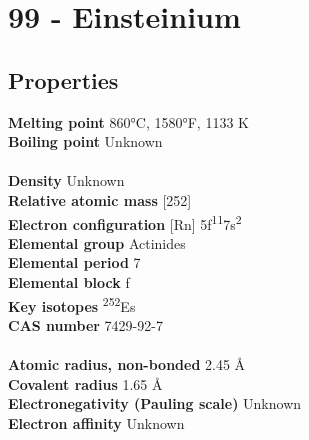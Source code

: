 \section{99 - Einsteinium}
\label{sec:elem-einsteinium}
\subsection{Properties}
\textbf{Melting point} 860°C, 1580°F, 1133 K\\
\textbf{Boiling point} Unknown\\
\\
\textbf{Density} Unknown\\
\textbf{Relative atomic mass} [252]\\
\textbf{Electron configuration} [Rn] 5f\textsuperscript{11}7s\textsuperscript{2}\\
\textbf{Elemental group} Actinides\\
\textbf{Elemental period} 7\\
\textbf{Elemental block} f\\
\textbf{Key isotopes} \textsuperscript{252}Es\\
\textbf{CAS number} 7429-92-7\\
\\
\textbf{Atomic radius, non-bonded} 2.45 Å\\
\textbf{Covalent radius} 1.65 Å\\
\textbf{Electronegativity (Pauling scale)} Unknown\\
\textbf{Electron affinity} Unknown\\